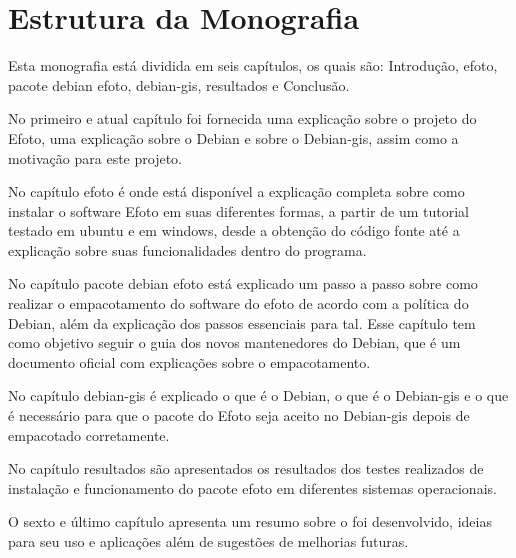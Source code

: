 \section*{Estrutura da Monografia}

Esta monografia está dividida em seis capítulos, os quais são: Introdução, efoto, pacote debian efoto, debian-gis, resultados e Conclusão.

No primeiro e atual capítulo foi fornecida uma explicação sobre o projeto do Efoto, uma explicação sobre o Debian e sobre o Debian-gis, assim como a motivação para este projeto.

No capítulo efoto é onde está disponível a explicação completa sobre como instalar o software Efoto em suas diferentes formas, a partir de um tutorial testado em ubuntu e em windows, desde a obtenção do código fonte até a explicação sobre suas funcionalidades dentro do programa.

No capítulo pacote debian efoto está explicado um passo a passo sobre como realizar o empacotamento do software do efoto de acordo com a política do Debian, além da explicação dos passos essenciais para tal. Esse capítulo tem como objetivo seguir o guia dos novos mantenedores do Debian, que é um documento oficial com explicações sobre o empacotamento.

No capítulo debian-gis é explicado o que é o Debian, o que é o Debian-gis e o que é necessário para que o pacote do Efoto seja aceito no Debian-gis depois de empacotado corretamente.

No capítulo resultados são apresentados os resultados dos testes realizados de instalação e funcionamento do pacote efoto em diferentes sistemas operacionais.

O sexto e último capítulo apresenta um resumo sobre o foi desenvolvido, ideias para seu uso e aplicações além de sugestões de melhorias futuras.

 